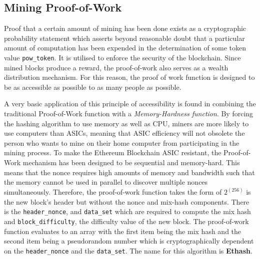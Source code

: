 \documentclass[10pt,letterpaper,leqno,bibliography=totoc]{scrartcl}
\newenvironment{alphafootnotes}
{\par\edef\savedfootnotenumber{\number\value{footnote}}
\renewcommand{\thefootnote}{\alph{footnote}}
\setcounter{footnote}{0}}
{\par\setcounter{footnote}{\savedfootnotenumber}}
\begin{document}
\begin{alphafootnotes}
\begin{multicols*}{2}
		
		\subsection{Mining Proof-of-Work} Proof that a certain amount of mining has been done exists as a cryptographic probability statement which asserts beyond reasonable doubt that a particular amount of computation has been expended in the determination of some token value \texttt{pow\_token}. It is utilised to enforce the security of the blockchain. Since mined blocks produce a reward, the proof-of-work also serves  as a wealth distribution mechanism. For this reason, the  proof of work function is designed to be as accessible as possible to as many people as possible. 

		A very basic application of this principle of accessibility is found in combining the traditional Proof-of-Work function with a \textit{Memory-Hardness function}. By forcing the hashing algorithm to use memory as well as CPU, miners are more likely to use computers than ASICs, meaning that ASIC efficiency will not obsolete the person who wants to mine on their home computer from participating in the mining process.  To make the Ethereum Blockchain ASIC resistant, the Proof-of-Work mechanism has been designed to be sequential and  memory-hard. This means that the nonce requires high amounts of memory and bandwidth such that the memory cannot be used in parallel to discover multiple nonces simultaneously. Therefore, the proof-of-work function takes the form of $2^(256)$ is the new block’s header but without the nonce and mix-hash components. There is the \texttt{header\_nonce}, and \texttt{data\_set} which are required  to compute the mix hash and \texttt{block\_difficulty}, the difficulty value of the new block. The proof-of-work function evaluates to an array with the first item being the mix hash and the second item being a pseudorandom number which is cryptographically dependent on the \texttt{header\_nonce} and the \texttt{data\_set}. The name for this algorithm is \textbf{Ethash}. 
			

\end{multicols*}
\end{alphafootnotes}
\end{document}
